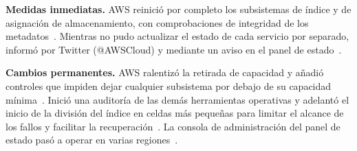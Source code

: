 \textbf{Medidas inmediatas.}
AWS reinició por completo los subsistemas de índice y de asignación
de almacenamiento, con comprobaciones de integridad de los
metadatos~\cite{aws-s3-2017}.
Mientras no pudo actualizar el estado de cada servicio por separado,
informó por Twitter (@AWSCloud) y mediante un aviso en el panel de
estado~\cite{aws-s3-2017}.

\textbf{Cambios permanentes.}
AWS ralentizó la retirada de capacidad y añadió controles que impiden
dejar cualquier subsistema por debajo de su capacidad
mínima~\cite{aws-s3-2017}.
Inició una auditoría de las demás herramientas operativas y adelantó
el inicio de la división del índice en celdas más pequeñas para limitar
el alcance de los fallos y facilitar la recuperación~\cite{aws-s3-2017}.
La consola de administración del panel de estado pasó a operar en
varias regiones~\cite{aws-s3-2017}.
